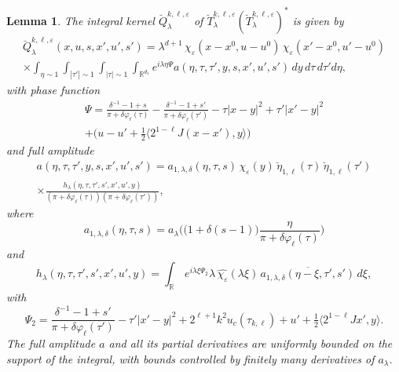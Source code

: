 \documentclass[leqno]{amsart}
\newtheorem{lemma}[theorem]{Lemma}
\theoremstyle{definition}
\theoremstyle{remark}
\numberwithin{equation}{section}
\newcommand{\R}{\mathbb{R}}
\renewcommand{\hat}{\widehat}
\newcommand\la{{\lambda}}
\newcommand\de{{\delta}}
\begin{document}
\begin{lemma}\label{lem:kl-TTstar}
The integral kernel $\breve Q^{k,\ell,\varepsilon}_{\lambda}$ of $\breve T^{k,\ell,\varepsilon}_\lambda(\breve T^{k,\ell,\varepsilon}_\lambda)^*$ is given by
\begin{multline}\label{eq:Qkl}
\breve Q^{k,\ell,\varepsilon}_{\lambda}(x,u,s,x',u',s')
 = \lambda^{d+1}\,\chi_\varepsilon(x-x^0,u-u^0)\,\chi_\varepsilon(x'-x^0,u'-u^0) \\ \times \int_{\eta\sim 1} \int_{|\tau'|\sim 1} \int_{|\tau|\sim 1} \int_{\R^{d_1}} e^{i\lambda \eta \Psi} a(\eta,\tau,\tau',y,s,x',u',s')\, dy \, d\tau \, d\tau' d\eta, 
\end{multline}
with phase function
\begin{multline}
\Psi = \frac{\delta^{-1}-1 + s}{\pi + \delta \varphi_\ell(\tau)}
 - \frac{\delta^{-1}-1 + s'}{\pi + \delta \varphi_\ell(\tau')} 
 - \tau| x-y|^2 + \tau'| x'-y|^2 \\
 + \big( u - u' + \tfrac 1 2 \langle 2^{1-\ell} J(x-x'),y\rangle\big) \label{eq:Psi-kl}
\end{multline}
and full amplitude
\begin{multline}\label{eq:kl-TTstar-amplitude}
a(\eta,\tau,\tau',y,s,x',u',s')
= a_{1,\la,\de}(\eta,\tau,s)\,\chi_\varepsilon(y)\,\breve\eta_{1,\ell}(\tau) \, \breve\eta_{1,\ell}(\tau')\\
\times \frac{h_\lambda(\eta,\tau,\tau',s',x',u',y)}{(\pi+\delta\varphi_\ell(\tau))(\pi+\delta\varphi_\ell(\tau'))},
\end{multline}
where
\begin{equation}\label{eq:kl-TTstar-a}
a_{1,\la,\de}(\eta,\tau,s) 
= a_{\la}\Big(\big(1+\delta(s-1)\big)\frac \eta{\pi + \delta \varphi_\ell(\tau)}\Big)
\end{equation}
and
\begin{equation}
\label{hlambda}
h_\lambda(\eta,\tau,\tau',s',x',u',y) 
= \int_\R \, e^{i\lambda\xi\Psi_2} 
\lambda\, \hat{\chi_\varepsilon}(\lambda\xi)
\, \overline{a_{1,\la,\de}(\eta-\xi,\tau',s')}
\,d\xi,
\end{equation}
with
\begin{equation}\label{Psi2}
\Psi_2
= \frac{\delta^{-1}-1 + s'}{\pi + \delta \varphi_\ell(\tau')} - \tau'\left|x'-y\right|^2 +  2^{\ell+1} k^2 u_c(\tau_{k,\ell} ) + u' + \tfrac 1 2 \langle 2^{1-\ell} Jx',y\rangle.
\end{equation}
The full amplitude $a$ and all its partial derivatives are uniformly bounded on the support of the integral, with bounds controlled by finitely many derivatives of $a_\la$.
\end{lemma}
\end{document}
